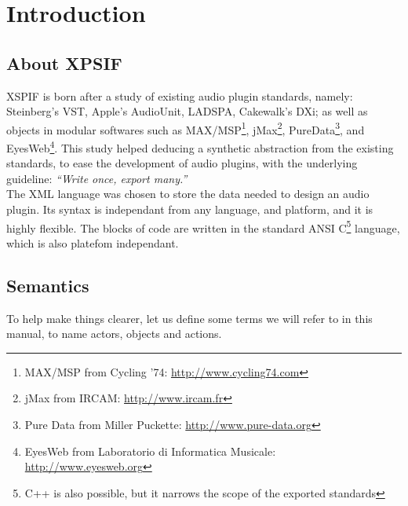 

\chapter{Introduction}

\section{About XPSIF}
\noindent XSPIF is born after a study \cite{pluginarch} of existing audio plugin standards, namely: Steinberg's VST, Apple's AudioUnit, LADSPA, Cakewalk's DXi; as well as objects in modular softwares such as MAX/MSP\footnote{MAX/MSP from Cycling '74: \url{http://www.cycling74.com}}, jMax\footnote{jMax from IRCAM: \url{http://www.ircam.fr}}, PureData\footnote{Pure Data from Miller Puckette: \url{http://www.pure-data.org}}, and EyesWeb\footnote{EyesWeb from Laboratorio di Informatica Musicale: \url{http://www.eyesweb.org}}.
\noindent This study helped deducing a synthetic abstraction from the existing standards, to ease the development of audio plugins, with the underlying guideline: \textit{``Write once, export many.''}\\

\noindent The XML language was chosen to store the data needed to
design an audio plugin. Its syntax is independant from any language,
and platform, and it is highly flexible. The blocks of code are
written in the standard ANSI C\footnote{C++ is also possible, but it
  narrows the scope of the exported standards}
language, which is also platefom independant.\\ 

\section{Semantics}
\noindent To help make things clearer, let us define some terms we will refer to in this manual, to name actors, objects and actions. 

